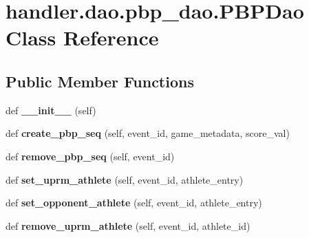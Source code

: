 \hypertarget{classhandler_1_1dao_1_1pbp__dao_1_1_p_b_p_dao}{}\section{handler.\+dao.\+pbp\+\_\+dao.\+P\+B\+P\+Dao Class Reference}
\label{classhandler_1_1dao_1_1pbp__dao_1_1_p_b_p_dao}
\subsection*{Public Member Functions}
\begin{DoxyCompactItemize}
\item 
\mbox{\label{classhandler_1_1dao_1_1pbp__dao_1_1_p_b_p_dao_aed87d702c45ef76295f6e1c4f4bba7f6}} 
def {\bfseries \+\_\+\+\_\+init\+\_\+\+\_\+} (self)
\item 
\mbox{\label{classhandler_1_1dao_1_1pbp__dao_1_1_p_b_p_dao_ab5691fa252a6c95475ce1177e8524e58}} 
def {\bfseries create\+\_\+pbp\+\_\+seq} (self, event\+\_\+id, game\+\_\+metadata, score\+\_\+val)
\item 
\mbox{\label{classhandler_1_1dao_1_1pbp__dao_1_1_p_b_p_dao_a6c920f35c66c135f03d4bc973396d1a1}} 
def {\bfseries remove\+\_\+pbp\+\_\+seq} (self, event\+\_\+id)
\item 
\mbox{\label{classhandler_1_1dao_1_1pbp__dao_1_1_p_b_p_dao_a9796b031f3f16f8edd59b6b52ed18a39}} 
def {\bfseries set\+\_\+uprm\+\_\+athlete} (self, event\+\_\+id, athlete\+\_\+entry)
\item 
\mbox{\label{classhandler_1_1dao_1_1pbp__dao_1_1_p_b_p_dao_a8fb43c276529f4747419d30551badba7}} 
def {\bfseries set\+\_\+opponent\+\_\+athlete} (self, event\+\_\+id, athlete\+\_\+entry)
\item 
\mbox{\label{classhandler_1_1dao_1_1pbp__dao_1_1_p_b_p_dao_a8f5c7ee21ed3fb4536bf421c000248c8}} 
def {\bfseries remove\+\_\+uprm\+\_\+athlete} (self, event\+\_\+id, athlete\+\_\+id)
\item 

\end{DoxyCompactItemize}

